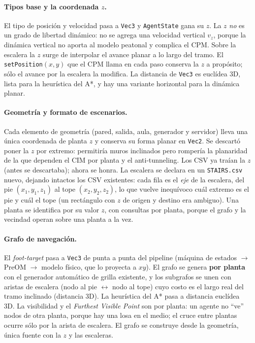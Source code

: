 \documentclass[11pt,a4paper]{article}
\begin{document}
\paragraph{Tipos base y la coordenada $z$.}
El tipo de posición y velocidad pasa a \texttt{Vec3} y \texttt{AgentState} gana su $z$. La $z$
\emph{no} es un grado de libertad dinámico: no se agrega una velocidad vertical $v_z$, porque la
dinámica vertical no aporta al modelo peatonal y complica el CPM. Sobre la escalera la $z$ surge
de interpolar el avance planar a lo largo del tramo. El \texttt{setPosition}$(x,y)$ que el CPM
llama en cada paso conserva la $z$ a propósito; sólo el avance por la escalera la modifica. La
distancia de \texttt{Vec3} es euclídea 3D, lista para la heurística del A*, y hay una variante
horizontal para la dinámica planar.

\paragraph{Geometría y formato de escenarios.}
Cada elemento de geometría (pared, salida, aula, generador y servidor) lleva una única coordenada
de planta $z$ y conserva su forma planar en \texttt{Vec2}. Se descartó poner la $z$ por extremo:
permitiría muros inclinados pero rompería la planaridad de la que dependen el CIM por planta y el
anti-tunneling. Los CSV ya traían la $z$ (antes se descartaba); ahora se honra. La escalera se
declara en un \texttt{STAIRS.csv} nuevo, dejando intactos los CSV existentes: cada fila es el
\emph{eje} de la escalera, del pie $(x_1,y_1,z_1)$ al tope $(x_2,y_2,z_2)$, lo que vuelve
inequívoco cuál extremo es el pie y cuál el tope (un rectángulo con $z$ de origen y destino era
ambiguo). Una planta se identifica por su valor $z$, con consultas por planta, porque el grafo y
la vecindad operan sobre una planta a la vez.

\paragraph{Grafo de navegación.}
El \emph{foot-target} pasa a \texttt{Vec3} de punta a punta del pipeline (máquina de estados
$\rightarrow$ PreOM $\rightarrow$ modelo físico, que lo proyecta a $xy$). El grafo se genera
\textbf{por planta} con el generador automático de grilla existente, y los subgrafos se unen con
aristas de escalera (nodo al pie $\leftrightarrow$ nodo al tope) cuyo costo es el largo real del
tramo inclinado (distancia 3D). La heurística del A* pasa a distancia euclídea 3D. La visibilidad
y el \emph{Furthest Visible Point} son por planta: un agente no ``ve''
nodos de otra planta, porque hay una losa en el medio; el cruce entre plantas ocurre sólo por la
arista de escalera. El grafo se construye desde la geometría, única fuente con la $z$ y las
escaleras.
\end{document}
